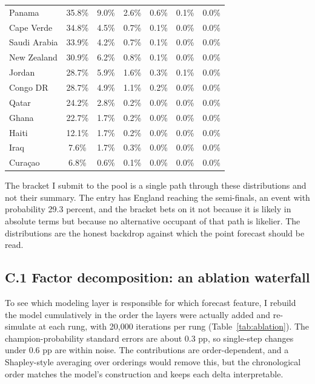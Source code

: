 \documentclass[11pt,letterpaper]{article}
\begin{document}
\begin{table}[p]
\begin{tabular}{lcccccc}
Panama                 & 35.8\% &  9.0\% &  2.6\% &  0.6\% &  0.1\% &  0.0\% \\
Cape Verde             & 34.8\% &  4.5\% &  0.7\% &  0.1\% &  0.0\% &  0.0\% \\
Saudi Arabia           & 33.9\% &  4.2\% &  0.7\% &  0.1\% &  0.0\% &  0.0\% \\
New Zealand            & 30.9\% &  6.2\% &  0.8\% &  0.1\% &  0.0\% &  0.0\% \\
Jordan                 & 28.7\% &  5.9\% &  1.6\% &  0.3\% &  0.1\% &  0.0\% \\
Congo DR               & 28.7\% &  4.9\% &  1.1\% &  0.2\% &  0.0\% &  0.0\% \\
Qatar                  & 24.2\% &  2.8\% &  0.2\% &  0.0\% &  0.0\% &  0.0\% \\
Ghana                  & 22.7\% &  1.7\% &  0.2\% &  0.0\% &  0.0\% &  0.0\% \\
Haiti                  & 12.1\% &  1.7\% &  0.2\% &  0.0\% &  0.0\% &  0.0\% \\
Iraq                   &  7.6\% &  1.7\% &  0.3\% &  0.0\% &  0.0\% &  0.0\% \\
Curaçao                &  6.8\% &  0.6\% &  0.1\% &  0.0\% &  0.0\% &  0.0\% \\
\bottomrule
\end{tabular}
\end{table}

The bracket I submit to the pool is a single path through these distributions and not their summary. The entry has England reaching the semi-finals, an event with probability 29.3 percent, and the bracket bets on it not because it is likely in absolute terms but because no alternative occupant of that path is likelier. The distributions are the honest backdrop against which the point forecast should be read.

\subsection*{C.1 \quad Factor decomposition: an ablation waterfall}

To see which modeling layer is responsible for which forecast feature, I rebuild the model cumulatively in the order the layers were actually added and re-simulate at each rung, with 20{,}000 iterations per rung (Table~\ref{tab:ablation}). The champion-probability standard errors are about 0.3 pp, so single-step changes under 0.6 pp are within noise. The contributions are order-dependent, and a Shapley-style averaging over orderings would remove this, but the chronological order matches the model's construction and keeps each delta interpretable.
\end{document}
